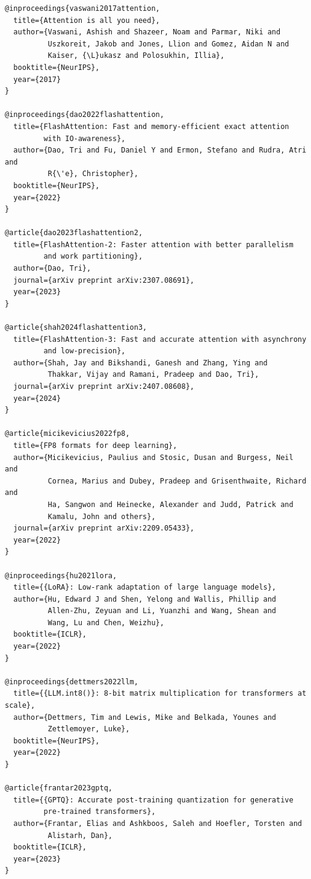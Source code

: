 \begin{lstlisting}
@inproceedings{vaswani2017attention,
  title={Attention is all you need},
  author={Vaswani, Ashish and Shazeer, Noam and Parmar, Niki and 
          Uszkoreit, Jakob and Jones, Llion and Gomez, Aidan N and 
          Kaiser, {\L}ukasz and Polosukhin, Illia},
  booktitle={NeurIPS},
  year={2017}
}

@inproceedings{dao2022flashattention,
  title={FlashAttention: Fast and memory-efficient exact attention 
         with IO-awareness},
  author={Dao, Tri and Fu, Daniel Y and Ermon, Stefano and Rudra, Atri and 
          R{\'e}, Christopher},
  booktitle={NeurIPS},
  year={2022}
}

@article{dao2023flashattention2,
  title={FlashAttention-2: Faster attention with better parallelism 
         and work partitioning},
  author={Dao, Tri},
  journal={arXiv preprint arXiv:2307.08691},
  year={2023}
}

@article{shah2024flashattention3,
  title={FlashAttention-3: Fast and accurate attention with asynchrony 
         and low-precision},
  author={Shah, Jay and Bikshandi, Ganesh and Zhang, Ying and 
          Thakkar, Vijay and Ramani, Pradeep and Dao, Tri},
  journal={arXiv preprint arXiv:2407.08608},
  year={2024}
}

@article{micikevicius2022fp8,
  title={FP8 formats for deep learning},
  author={Micikevicius, Paulius and Stosic, Dusan and Burgess, Neil and 
          Cornea, Marius and Dubey, Pradeep and Grisenthwaite, Richard and 
          Ha, Sangwon and Heinecke, Alexander and Judd, Patrick and 
          Kamalu, John and others},
  journal={arXiv preprint arXiv:2209.05433},
  year={2022}
}

@inproceedings{hu2021lora,
  title={{LoRA}: Low-rank adaptation of large language models},
  author={Hu, Edward J and Shen, Yelong and Wallis, Phillip and 
          Allen-Zhu, Zeyuan and Li, Yuanzhi and Wang, Shean and 
          Wang, Lu and Chen, Weizhu},
  booktitle={ICLR},
  year={2022}
}

@inproceedings{dettmers2022llm,
  title={{LLM.int8()}: 8-bit matrix multiplication for transformers at scale},
  author={Dettmers, Tim and Lewis, Mike and Belkada, Younes and 
          Zettlemoyer, Luke},
  booktitle={NeurIPS},
  year={2022}
}

@article{frantar2023gptq,
  title={{GPTQ}: Accurate post-training quantization for generative 
         pre-trained transformers},
  author={Frantar, Elias and Ashkboos, Saleh and Hoefler, Torsten and 
          Alistarh, Dan},
  booktitle={ICLR},
  year={2023}
}


\end{lstlisting}
